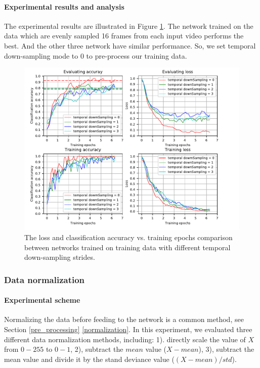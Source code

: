 \paragraph{Experimental results and  analysis}
The experimental results are illustrated in Figure \ref{fig:plot_tds}. The network trained on the data which are evenly sampled 16 frames from each input video performs the best. And the other three network have similar performance. So, we set temporal down-sampling mode to 0 to pre-process our training data.
\begin{figure}
	\includegraphics[trim=0cm 0cm 0cm 0cm]{fig01/plot_tds.pdf}
	\caption{The loss and classification accuracy vs. training epochs comparison between networks trained on training data with different temporal down-sampling strides.}
	\label{fig:plot_tds}
\end{figure}


\subsubsection{Data normalization}
\paragraph{Experimental scheme}
Normalizing the data before feeding to the network is a common method, see Section \ref{pre_processing} \ref{normalization}. In this experiment, we evaluated three different data normalization methods, including: 1). directly scale the value of \(X\) from \(0-255\) to \(0-1\), 2), subtract the \(mean\) value (\(X-mean\)),  3), subtract the mean value and divide it by the stand deviance value (\((X-mean)/std\)).   
